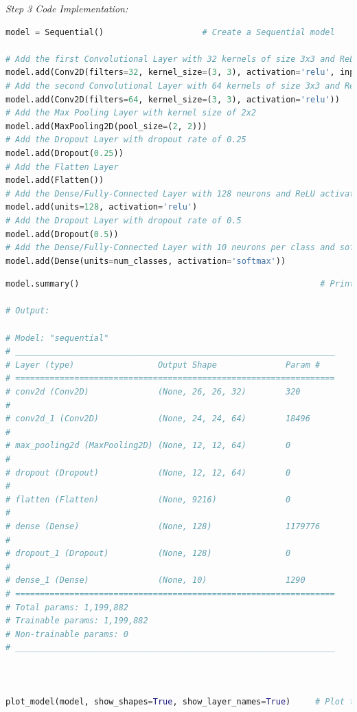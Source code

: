 \documentclass{book}
\begin{document}
\vspace{1mm}
\textit{\large Step 3 Code Implementation:}\\
\begin{lstlisting}[language=Python, basicstyle=\ttfamily\small, keywordstyle=\color{blue}, commentstyle=\color{forestgreen}, stringstyle=\color{red}, showstringspaces=false]
model = Sequential()                    # Create a Sequential model

# Add the first Convolutional Layer with 32 kernels of size 3x3 and ReLU activation function
model.add(Conv2D(filters=32, kernel_size=(3, 3), activation='relu', input_shape=(28, 28, 1)))
# Add the second Convolutional Layer with 64 kernels of size 3x3 and ReLU activation function
model.add(Conv2D(filters=64, kernel_size=(3, 3), activation='relu'))
# Add the Max Pooling Layer with kernel size of 2x2
model.add(MaxPooling2D(pool_size=(2, 2)))
# Add the Dropout Layer with dropout rate of 0.25
model.add(Dropout(0.25))
# Add the Flatten Layer
model.add(Flatten())
# Add the Dense/Fully-Connected Layer with 128 neurons and ReLU activation function
model.add(units=128, activation='relu')
# Add the Dropout Layer with dropout rate of 0.5
model.add(Dropout(0.5))
# Add the Dense/Fully-Connected Layer with 10 neurons per class and softmax activation function
model.add(Dense(units=num_classes, activation='softmax'))
\end{lstlisting}
\newpage
\begin{lstlisting}[language=Python, basicstyle=\ttfamily\small, keywordstyle=\color{blue}, commentstyle=\color{forestgreen}, stringstyle=\color{red}, showstringspaces=false]
model.summary()                                                 # Print the model summary

# Output:

# Model: "sequential"
# _________________________________________________________________
# Layer (type)                 Output Shape              Param #
# =================================================================
# conv2d (Conv2D)              (None, 26, 26, 32)        320
# 
# conv2d_1 (Conv2D)            (None, 24, 24, 64)        18496
#
# max_pooling2d (MaxPooling2D) (None, 12, 12, 64)        0
#
# dropout (Dropout)            (None, 12, 12, 64)        0
#
# flatten (Flatten)            (None, 9216)              0
#
# dense (Dense)                (None, 128)               1179776
#
# dropout_1 (Dropout)          (None, 128)               0
#
# dense_1 (Dense)              (None, 10)                1290
# =================================================================
# Total params: 1,199,882
# Trainable params: 1,199,882
# Non-trainable params: 0
# _________________________________________________________________



plot_model(model, show_shapes=True, show_layer_names=True)     # Plot the model
\end{lstlisting}
\end{document}
